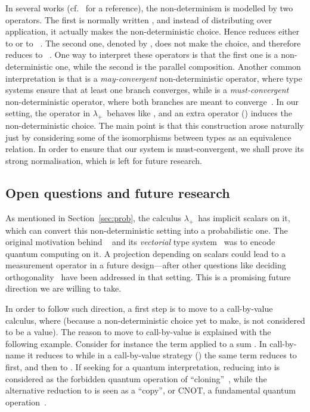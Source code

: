 \documentclass[final,copyright,creativecommons]{eptcs}
\newcommand{\OurCalculus}{\ensuremath{\lambda_+}}
\theoremstyle{definition}
\begin{document}
In several works (cf.~\cite[\S3.4]{ManzonettoPhDThesis} for a reference), the non-determinism is modelled by two operators. The first  is normally written , and instead of distributing over application, it actually makes the non-deterministic choice. Hence  reduces either to  or to ~\cite{deLiguoroPipernoIC95}. The second one, denoted by , does not make the choice, and therefore  reduces to ~\cite{DezaniciancagliniDeliguoroPipernoSIAM98}. One way to interpret these operators is that the first one is a non-deterministic one, while the second is the parallel composition. Another common interpretation is that  is a {\it may-convergent} non-deterministic operator, where type systems ensure that at least one branch converges, while  is a {\it must-convergent} non-deterministic operator, where both branches are meant to converge~\cite{BucciarelliEhrhardManzonettoAPAL12,DiazcaroManzonettoPaganiLFCS13}. In our setting, the  operator in \OurCalculus\ behaves like , and an extra operator () induces the non-deterministic choice.
The main point is that this construction arose naturally just by considering some of the isomorphisms between types as an equivalence relation.
In order to ensure that our system is must-convergent, we shall prove its strong normalisation, which is left for future research.

\subsection{Open questions and future research}
As mentioned in Section~\ref{sec:prob}, the calculus \OurCalculus\ has implicit scalars on it, which can convert this non-deterministic setting into a probabilistic one. The original motivation behind ~\cite{ArrighiDowekRTA08} and its {\em vectorial} type system~\cite{ArrighiDiazcaroValironDCM11} was to encode quantum computing on it. A projection depending on scalars could lead to a measurement operator in a future design---after other questions like deciding orthogonality~\cite{ValironQPL10} have been addressed in that setting. This is a promising future direction we are willing to take.

In order to follow such direction, a first step is to move to a call-by-value calculus, where  (because a non-deterministic choice yet to make, is not considered to be a value). The reason to move to call-by-value is explained with the following example. Consider for instance the term \delta applied to a sum . In call-by-name it reduces to  while in a call-by-value strategy  () the same term reduces to \delta\delta first, and then to . If seeking for a quantum interpretation, reducing \delta into  is considered as the forbidden quantum operation of ``cloning''~\cite{WoottersZurekNATURE82}, while the alternative reduction to  is seen as a ``copy'', or CNOT, a fundamental quantum operation~\cite{MonroeMeekhofKingItanoWinelandPRL95}.
\end{document}
